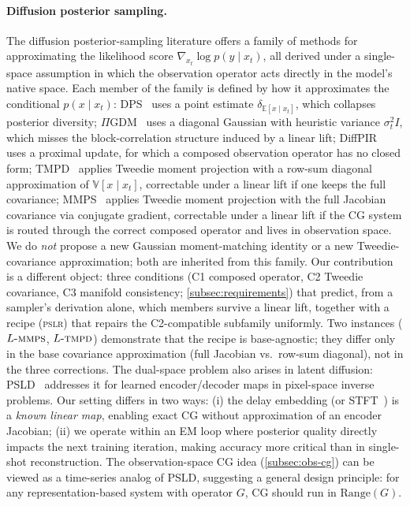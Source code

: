\documentclass{article}
\theoremstyle{plain}
\theoremstyle{definition}
\theoremstyle{remark}
\newcommand{\pslr}{\textsc{pslr}}
\newcommand{\lmmps}{L\mbox{-}\textsc{mmps}}
\newcommand{\ltmpd}{L\mbox{-}\textsc{tmpd}}
\begin{document}
\paragraph{Diffusion posterior sampling.}
The diffusion posterior-sampling literature offers a family of methods for approximating the likelihood score $\nabla_{x_t} \log p(y \mid x_t)$, all derived under a single-space assumption in which the observation operator acts directly in the model's native space. Each member of the family is defined by how it approximates the conditional $p(x \mid x_t)$: DPS~\citep{chung2023dps} uses a point estimate $\delta_{\mathbb{E}[x \mid x_t]}$, which collapses posterior diversity; $\Pi$GDM~\citep{song2023pigdm} uses a diagonal Gaussian with heuristic variance $\sigma_t^2 I$, which misses the block-correlation structure induced by a linear lift; DiffPIR~\citep{zhu2023diffpir} uses a proximal update, for which a composed observation operator has no closed form; TMPD~\citep{boys2023tmpd} applies Tweedie moment projection with a row-sum diagonal approximation of $\mathbb{V}[x \mid x_t]$, correctable under a linear lift if one keeps the full covariance; MMPS~\citep{rozet2024diem} applies Tweedie moment projection with the full Jacobian covariance via conjugate gradient, correctable under a linear lift if the CG system is routed through the correct composed operator and lives in observation space. We do \emph{not} propose a new Gaussian moment-matching identity or a new Tweedie-covariance approximation; both are inherited from this family. Our contribution is a different object: three conditions (C1 composed operator, C2 Tweedie covariance, C3 manifold consistency; \cref{subsec:requirements}) that predict, from a sampler's derivation alone, which members survive a linear lift, together with a recipe (\pslr{}) that repairs the C2-compatible subfamily uniformly. Two instances ($\lmmps$, $\ltmpd$) demonstrate that the recipe is base-agnostic; they differ only in the base covariance approximation (full Jacobian vs.\ row-sum diagonal), not in the three corrections. The dual-space problem also arises in latent diffusion: PSLD~\citep{rout2024psld} addresses it for learned encoder/decoder maps in pixel-space inverse problems. Our setting differs in two ways: (i) the delay embedding (or STFT~\citep{griffin1984signal}) is a \emph{known linear map}, enabling exact CG without approximation of an encoder Jacobian; (ii) we operate within an EM loop where posterior quality directly impacts the next training iteration, making accuracy more critical than in single-shot reconstruction. The observation-space CG idea (\cref{subsec:obs-cg}) can be viewed as a time-series analog of PSLD, suggesting a general design principle: for any representation-based system with operator $G$, CG should run in $\mathrm{Range}(G)$.
\end{document}
